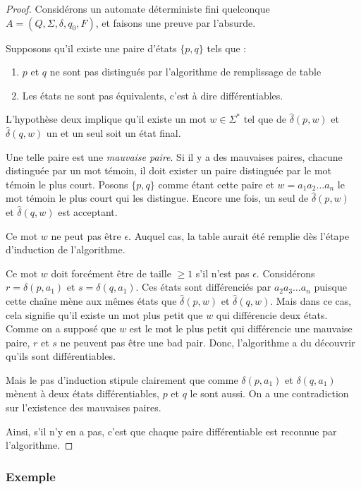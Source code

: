 \begin{proof}
	Considérons un automate déterministe fini quelconque $A = (Q, \Sigma, \delta, q_0, F)$, et faisons une preuve par l'absurde.
	
	Supposons qu'il existe une paire d'états $\{p,q\}$ tels que :
	\begin{enumerate}
		\item $p$ et $q$ ne sont pas distingués par l'algorithme de remplissage de table
		\item Les états ne sont pas équivalents, c'est à dire différentiables.
	\end{enumerate}
	
	L'hypothèse deux implique qu'il existe un mot $w \in \Sigma^*$ tel que de $\hat{\delta}(p,w)$ et $\hat{\delta}(q,w)$ un et un seul soit un état final.
	
	Une telle paire est une \emph{mauvaise paire}. Si il y a des mauvaises paires, chacune distinguée par un mot témoin, il doit exister un paire distinguée par le mot témoin le plus court. Posons $\{p,q\}$ comme étant cette paire et $w=a_1a_2\dots a_n$ le mot témoin le plus court qui les distingue. Encore une fois, un seul de $\hat{\delta}(p,w)$ et $\hat{\delta}(q,w)$ est acceptant.
	
	Ce mot $w$ ne peut pas être $\epsilon$. Auquel cas, la table aurait été remplie dès l'étape d'induction de l'algorithme.
	
	Ce mot $w$ doit forcément être de taille $\ge 1$ s'il n'est pas $\epsilon$. Considérons $r = \delta(p,a_1)$ et $s=\delta(q,a_1)$. Ces états sont différenciés par $a_2a_3\dots a_n$ puisque cette chaîne mène aux mêmes états que $\hat{\delta}(p,w)$ et $\hat{\delta}(q,w)$. Mais dans ce cas, cela signifie qu'il existe un mot plus petit que $w$ qui différencie deux états. Comme on a supposé que $w$ est le mot le plus petit qui différencie une mauvaise paire, $r$ et $s$ ne peuvent pas être une bad pair. Donc, l'algorithme a du découvrir qu'ils sont différentiables.
	
	Mais le pas d'induction stipule clairement que comme $\delta(p, a_1)$ et $\delta(q, a_1)$ mènent à deux états différentiables, $p$ et $q$ le sont aussi. On a une contradiction sur l'existence des mauvaises paires.
	
	Ainsi, s'il n'y en a pas, c'est que chaque paire différentiable est reconnue par l'algorithme.
\end{proof}


\subsubsection{Exemple}

